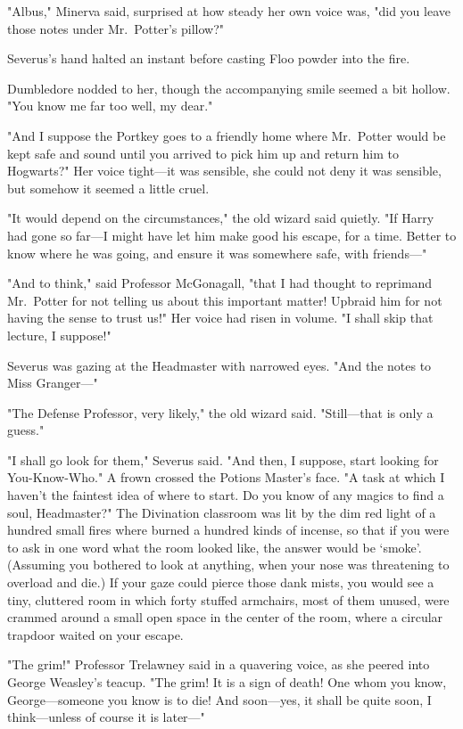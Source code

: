 "Albus," Minerva said, surprised at how steady her own voice was, "did you
leave those notes under Mr.~Potter's pillow?"

Severus's hand halted an instant before casting Floo powder into the fire.

Dumbledore nodded to her, though the accompanying smile seemed a bit hollow.
"You know me far too well, my dear."

"And I suppose the Portkey goes to a friendly home where Mr.~Potter would be
kept safe and sound until you arrived to pick him up and return him to
Hogwarts?" Her voice tight---it was sensible, she could not deny it was
sensible, but somehow it seemed a little cruel.

"It would depend on the circumstances," the old wizard said quietly. "If Harry
had gone so far---I might have let him make good his escape, for a time. Better
to know where he was going, and ensure it was somewhere safe, with friends\mbox{---}"

"And to think," said Professor McGonagall, "that I had thought to reprimand
Mr.~Potter for not telling us about this important matter! Upbraid him for not
having the sense to trust us!" Her voice had risen in volume. "I shall skip
that lecture, I suppose!"

Severus was gazing at the Headmaster with narrowed eyes. "And the notes to Miss
Granger\mbox{---}"

"The Defense Professor, very likely," the old wizard said. "Still---that is
only a guess."

"I shall go look for them," Severus said. "And then, I suppose, start looking
for You-Know-Who." A frown crossed the Potions Master's face. "A task at which
I haven't the faintest idea of where to start. Do you know of any magics to
find a soul, Headmaster?"
\sbreak
The Divination classroom was lit by the dim red light of a hundred small fires
where burned a hundred kinds of incense, so that if you were to ask in one word
what the room looked like, the answer would be `smoke'. (Assuming you bothered
to look at anything, when your nose was threatening to overload and die.) If
your gaze could pierce those dank mists, you would see a tiny, cluttered room
in which forty stuffed armchairs, most of them unused, were crammed around a
small open space in the center of the room, where a circular trapdoor waited on
your escape.

"The grim!" Professor Trelawney said in a quavering voice, as she peered into
George Weasley's teacup. "The grim! It is a sign of death! One whom you know,
George---someone you know is to die! And soon---yes, it shall be quite soon, I
think---unless of course it is later\mbox{---}"

